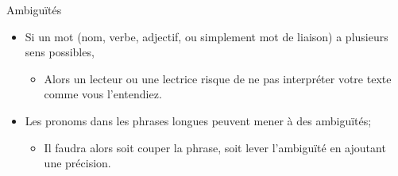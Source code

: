 \documentclass[french]{beamer}
\begin{document}
\begin{frame}{Ambiguïtés}

\begin{itemize}
	\item Si un mot (nom, verbe, adjectif, ou simplement mot de liaison) a plusieurs sens possibles,
	\begin{itemize}
		\item Alors un lecteur ou une lectrice risque de ne pas interpréter votre texte comme vous l'entendiez.
	\end{itemize}
	\item Les pronoms dans les phrases longues peuvent mener à des ambiguïtés;
	\begin{itemize}
		\item Il faudra alors soit couper la phrase, soit lever l'ambiguïté en ajoutant une précision.
	\end{itemize}
\end{itemize}

\end{frame}
\end{document}
